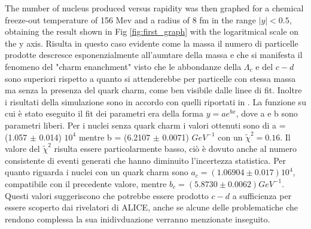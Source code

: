 \documentclass[12pt,a4paper]{book}
\begin{document}
	The number of nucleus produced versus rapidity was then graphed for a chemical freeze-out temperature of 156 Mev and a radius of 8 fm in the range $|y| <0.5$, obtaining the result shown in Fig \ref{fig:first_graph} with the logaritmical scale on the y axis. Risulta in questo caso evidente come la massa il numero di particelle prodotte descresce esponenzialmente all'aumtare della massa e che si manifesta il fenomeno del "charm enanchment" visto che le abbondanze della $\Lambda_c$ e del $c-d$ sono superiori rispetto a quanto si attenderebbe per particelle con stessa massa ma senza la presenza del quark charm, come ben visibile dalle linee di fit. Inoltre i risultati della simulazione sono in accordo con quelli riportati in \cite{alicecollaboration2022letterintentalice3}. La funzione su cui è stato eseguito il fit dei parametri era della forma $y= a e^{bx}$, dove a e b sono parametri liberi. Per i nuclei senza quark charm i valori ottenuti sono di a = (1.057 $\pm$ 0.014) $10^4$ mentre b = (6.2107 $\pm$ 0.0071) $GeV^{-1}$ con un $\tilde{\chi}^2 = 0.16$. Il valore del $\tilde{\chi}^2$ risulta essere particolarmente basso, ciò è dovuto anche al numero consistente di eventi generati che hanno diminuito l'incertezza statistica. Per quanto riguarda i nuclei con un quark charm sono $a_c = (1.06904 \pm 0.017) 10^4$, compatibile con il precedente valore, mentre $b_c = (5.8730 \pm 0.0062) GeV^{-1}$. Questi valori suggeriscono che potrebbe essere prodotto $c-d$ a sufficienza per essere scoperto dai rivelatori di ALICE, anche se alcune delle problematiche che rendono complessa la sua inidivduazione verranno menzionate inseguito.
\end{document}
